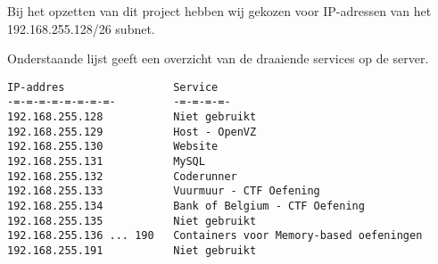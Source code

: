 Bij het opzetten van dit project hebben wij gekozen voor IP-adressen van het 192.168.255.128/26 subnet.

Onderstaande lijst geeft een overzicht van de draaiende services op de server.

\begin{lstlisting}
IP-addres                 Service
-=-=-=-=-=-=-=-=-         -=-=-=-=-
192.168.255.128           Niet gebruikt
192.168.255.129           Host - OpenVZ
192.168.255.130           Website
192.168.255.131           MySQL
192.168.255.132           Coderunner
192.168.255.133           Vuurmuur - CTF Oefening
192.168.255.134           Bank of Belgium - CTF Oefening
192.168.255.135           Niet gebruikt
192.168.255.136 ... 190   Containers voor Memory-based oefeningen
192.168.255.191           Niet gebruikt
     
\end{lstlisting}